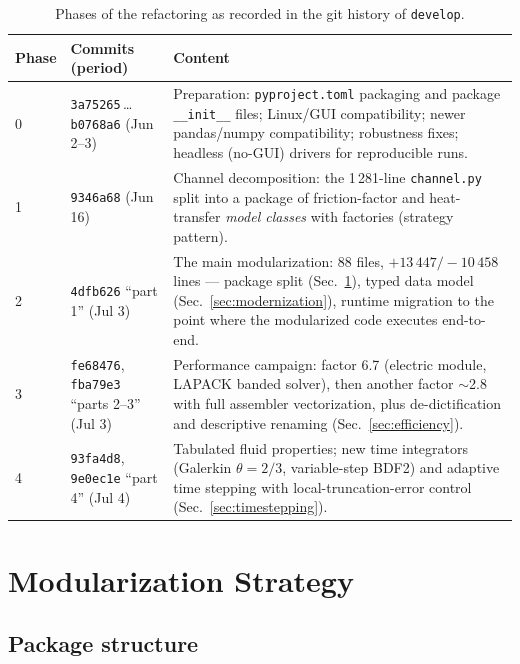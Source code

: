 \documentclass[11pt,a4paper]{article}
\newcommand{\code}[1]{\texttt{#1}}
\begin{document}
\begin{table}[ht]
  \centering
  \caption{Phases of the refactoring as recorded in the git history of
           \code{develop}.}
  \label{tab:chronology}
  \begin{tabular}{llp{8.6cm}}
    \toprule
    Phase & Commits (period) & Content \\
    \midrule
    0 & \code{3a75265}\,\ldots\,\code{b0768a6} (Jun 2--3) &
        Preparation: \code{pyproject.toml} packaging and package
        \code{\_\_init\_\_} files; Linux/GUI compatibility; newer
        pandas/numpy compatibility; robustness fixes; headless (no-GUI)
        drivers for reproducible runs. \\
    1 & \code{9346a68} (Jun 16) &
        Channel decomposition: the 1\,281-line \code{channel.py} split into a
        package of friction-factor and heat-transfer \emph{model classes} with
        factories (strategy pattern). \\
    2 & \code{4dfb626} ``part 1'' (Jul 3) &
        The main modularization: 88 files, $+13\,447/-10\,458$ lines ---
        package split (Sec.~\ref{sec:modularization}), typed data model
        (Sec.~\ref{sec:modernization}), runtime migration to the point where the
        modularized code executes end-to-end. \\
    3 & \code{fe68476}, \code{fba79e3} ``parts 2--3'' (Jul 3) &
        Performance campaign: factor 6.7 (electric module, LAPACK banded solver),
        then another factor $\sim$2.8 with full assembler vectorization, plus
        de-dictification and descriptive renaming
        (Sec.~\ref{sec:efficiency}). \\
    4 & \code{93fa4d8}, \code{9e0ec1e} ``part 4'' (Jul 4) &
        Tabulated fluid properties; new time integrators (Galerkin $\theta=2/3$,
        variable-step BDF2) and adaptive time stepping with local-truncation-error
        control (Sec.~\ref{sec:timestepping}). \\
    \bottomrule
  \end{tabular}
\end{table}

\section{Modularization Strategy}
\label{sec:modularization}

\subsection{Package structure}
\end{document}
